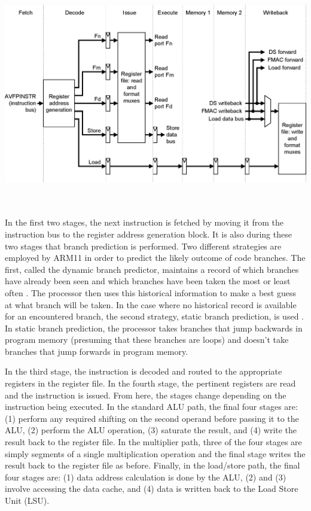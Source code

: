 \documentclass[onecolumn, draftclsnofoot, 10pt, compsoc]{IEEEtran}
\begin{document}
\begin{minipage}{\linewidth}
\begin{center}
\includegraphics[width=\textwidth]{ls_pipeline.eps}
\end{center}
\end{minipage}
\\ \\ In the first two stages, the next instruction is fetched by moving it from the instruction bus to the register address generation block. It is also during these two stages that branch prediction is performed. Two different strategies are employed by ARM11 in order to predict the likely outcome of code branches. The first, called the dynamic branch predictor, maintains a record of which branches have already been seen and which branches have been taken the most or least often \cite{arm11micro}. The processor then uses this historical information to make a best guess at what branch will be taken. In the case where no historical record is available for an encountered branch, the second strategy, static branch prediction, is used \cite{arm11micro}. In static branch prediction, the processor takes branches that jump backwards in program memory (presuming that these branches are loops) and doesn't take branches that jump forwards in program memory. 

In the third stage, the instruction is decoded and routed to the appropriate registers in the register file. In the fourth stage, the pertinent registers are read and the instruction is issued. From here, the stages change depending on the instruction being executed. In the standard ALU path, the final four stages are: (1) perform any required shifting on the second operand before passing it to the ALU, (2) perform the ALU operation, (3) saturate the result, and (4) write the result back to the register file. In the multiplier path, three of the four stages are simply segments of a single multiplication operation and the final stage writes the result back to the register file as before. Finally, in the load/store path, the final four stages are: (1) data address calculation is done by the ALU, (2) and (3) involve accessing the data cache, and (4) data is written back to the Load Store Unit (LSU).
\end{document}

